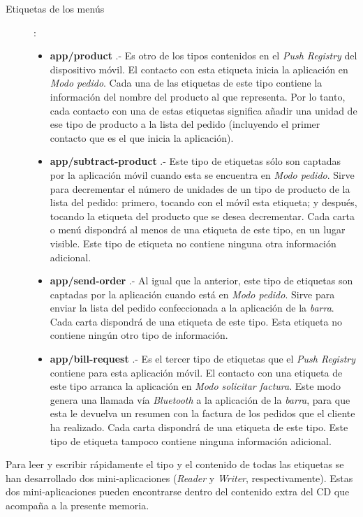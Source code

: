 \begin{description}
\item[Etiquetas de los menús]:
  \begin{itemize}
  \item \textbf{app/product} .- Es otro de los tipos contenidos en el
  \emph{Push Registry} del dispositivo móvil. El contacto con esta etiqueta
  inicia la aplicación en \emph{Modo pedido}. Cada una de las etiquetas de
  este tipo contiene la información del nombre del producto al que representa.
  Por lo tanto, cada contacto con una de estas etiquetas significa añadir
  una unidad de ese tipo de producto a la lista del pedido (incluyendo el
  primer contacto que es el que inicia la aplicación).
  \item \textbf{app/subtract-product} .- Este tipo de etiquetas sólo son
  captadas por la aplicación móvil cuando esta se encuentra en \emph{Modo
  pedido}. Sirve para decrementar el número de unidades de un tipo de
  producto de la lista del pedido: primero, tocando con el móvil esta etiqueta;
  y después, tocando la etiqueta del producto que se desea decrementar.
  Cada carta o menú dispondrá al menos de una etiqueta de este tipo, en un
  lugar visible. Este tipo de etiqueta no contiene ninguna otra información 
  adicional.
  \item \textbf{app/send-order} .- Al igual que la anterior, este tipo de
  etiquetas son captadas por la aplicación cuando está en \emph{Modo pedido}.
  Sirve para enviar la lista del pedido confeccionada a la aplicación de la
  \emph{barra}. Cada carta dispondrá de una etiqueta de este tipo.
  Esta etiqueta no contiene ningún otro tipo de información.
  \item \textbf{app/bill-request} .- Es el tercer tipo de etiquetas que el
  \emph{Push Registry} contiene para esta aplicación móvil. El contacto con
  una etiqueta de este tipo arranca la aplicación en \emph{Modo solicitar
  factura}. Este modo genera una llamada vía \emph{Bluetooth} a la aplicación
  de la \emph{barra}, para que esta le devuelva un resumen con la factura de
  los pedidos que el cliente ha realizado. Cada carta dispondrá de una
  etiqueta de este tipo. Este tipo de etiqueta tampoco contiene ninguna
   información adicional.
  \end{itemize}
\end{description}

Para leer y escribir rápidamente el tipo y el contenido de todas las etiquetas
se han desarrollado dos mini-aplicaciones (\emph{Reader} y \emph{Writer},
respectivamente). Estas dos mini-aplicaciones pueden encontrarse dentro del
contenido extra del CD que acompaña a la presente memoria.

